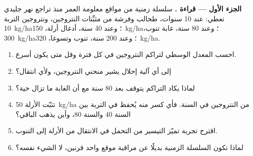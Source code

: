 \begin{problem}
\label{pb:b1:ecosystem-dynamics:1}

\medskip
\noindent\textbf{الجزء الأول --- قراءة .}
سلسلة زمنية من مواقع معلومة العمر منذ تراجع نهر جليدي
تعطي: عند 10 سنوات، طحالب وفرشة من مثبِّتات النتروجين، ونتروجين
التربة \qty{10}{kg/ha}؛ وعند 40 سنة، أدغال أرلة، \qty{150}{kg/ha}؛
وعند 80 سنة، غابة تنوب، \qty{300}{kg/ha}؛ وعند 200 سنة،
تنوب وتسوغا، \qty{320}{kg/ha}.
\begin{enumerate}
  \item احسب المعدل الوسطي لتراكم النتروجين في كل
        فترة وقل متى يكون أسرع.
  \item إلى أي آلية إحلال يشير منحني النتروجين،
        ولأي انتقال؟
  \item لماذا يكاد التراكم يتوقف بعد 80 سنة مع أن
        الغابة ما تزال حية؟
  \item تثبّت الأرلة \qty{50}{kg/ha} من النتروجين في السنة. فأي
        كسر منه يُحفظ في التربة بين السنة 40 والسنة
        80، وأين يذهب الباقي؟
  \item اقترح تجربة تميّز التيسير من
        التحمل في الانتقال من الأرلة إلى التنوب.
  \item لماذا تكون السلسلة الزمنية بديلًا عن مراقبة موقع واحد
        قرنين، لا الشيء نفسه؟
\end{enumerate}


\end{problem}
